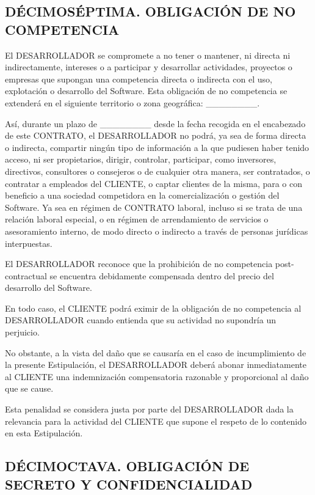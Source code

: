 \documentclass[a4paper,11pt]{report}
\begin{document}
	\subsection*{DÉCIMOSÉPTIMA. OBLIGACIÓN DE NO COMPETENCIA}

	El DESARROLLADOR se compromete a no tener o mantener, ni directa ni
	indirectamente, intereses o a participar y desarrollar actividades,
	proyectos o empresas que supongan una competencia directa o indirecta
	con el uso, explotación o desarrollo del Software. Esta obligación de no
	competencia se extenderá en el siguiente territorio o zona geográfica:
	\_\_\_\_\_\_\_\_.

	Así, durante un plazo de \_\_\_\_\_\_\_\_ desde la fecha recogida en el
	encabezado de este CONTRATO, el DESARROLLADOR no podrá, ya sea de forma
	directa o indirecta, compartir ningún tipo de información a la que
	pudiesen haber tenido acceso, ni ser propietarios, dirigir, controlar,
	participar, como inversores, directivos, consultores o consejeros o de
	cualquier otra manera, ser contratados, o contratar a empleados del
	CLIENTE, o captar clientes de la misma, para o con beneficio a una
	sociedad competidora en la comercialización o gestión del Software. Ya
	sea en régimen de CONTRATO laboral, incluso si se trata de una relación
	laboral especial, o en régimen de arrendamiento de servicios o
	asesoramiento interno, de modo directo o indirecto a través de personas
	jurídicas interpuestas.

	El DESARROLLADOR reconoce que la prohibición de no competencia
	post-contractual se encuentra debidamente compensada dentro del precio
	del desarrollo del Software.

	En todo caso, el CLIENTE podrá eximir de la obligación de no competencia
	al DESARROLLADOR cuando entienda que su actividad no supondría un
	perjuicio.

	No obstante, a la vista del daño que se causaría en el caso de
	incumplimiento de la presente Estipulación, el DESARROLLADOR deberá
	abonar inmediatamente al CLIENTE una indemnización compensatoria
	razonable y proporcional al daño que se cause.

	Esta penalidad se considera justa por parte del DESARROLLADOR dada la
	relevancia para la actividad del CLIENTE que supone el respeto de lo
	contenido en esta Estipulación.

	\subsection*{DÉCIMOCTAVA. OBLIGACIÓN DE SECRETO Y CONFIDENCIALIDAD}
\end{document}
